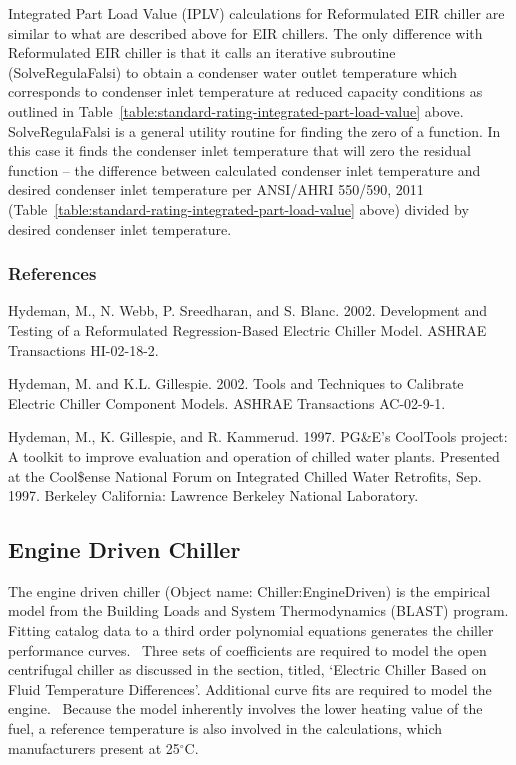 Integrated Part Load Value (IPLV) calculations for Reformulated EIR chiller are similar to what are described above for EIR chillers. The only difference with Reformulated EIR chiller is that it calls an iterative subroutine (SolveRegulaFalsi) to obtain a condenser water outlet temperature which corresponds to condenser inlet temperature at reduced capacity conditions as outlined in Table~\ref{table:standard-rating-integrated-part-load-value} above. SolveRegulaFalsi is a general utility routine for finding the zero of a function. In this case it finds the condenser inlet temperature that will zero the residual function -- the difference between calculated condenser inlet temperature and desired condenser inlet temperature per ANSI/AHRI 550/590, 2011 (Table~\ref{table:standard-rating-integrated-part-load-value} above) divided by desired condenser inlet temperature.

\subsubsection{References}\label{references-1-003}

Hydeman, M., N. Webb, P. Sreedharan, and S. Blanc. 2002. Development and Testing of a Reformulated Regression-Based Electric Chiller Model. ASHRAE Transactions HI-02-18-2.

Hydeman, M. and K.L. Gillespie. 2002. Tools and Techniques to Calibrate Electric Chiller Component Models. ASHRAE Transactions AC-02-9-1.

Hydeman, M., K. Gillespie, and R. Kammerud. 1997. PG\&E's CoolTools project: A toolkit to improve evaluation and operation of chilled water plants. Presented at the Cool\$ense National Forum on Integrated Chilled Water Retrofits, Sep. 1997. Berkeley California: Lawrence Berkeley National Laboratory.

\subsection{Engine Driven Chiller}\label{engine-driven-chiller}

The engine driven chiller (Object name: Chiller:EngineDriven) is the empirical model from the Building Loads and System Thermodynamics (BLAST) program. Fitting catalog data to a third order polynomial equations generates the chiller performance curves.~ Three sets of coefficients are required to model the open centrifugal chiller as discussed in the section, titled, `Electric Chiller Based on Fluid Temperature Differences'. Additional curve fits are required to model the engine.~ Because the model inherently involves the lower heating value of the fuel, a reference temperature is also involved in the calculations, which manufacturers present at 25\(^{\circ}\)C.

